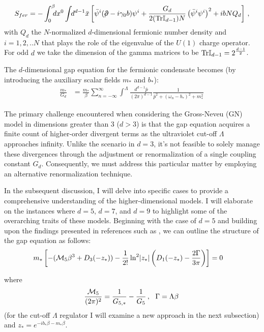 \documentclass[twoside]{article}
\begin{document}
\begin{align}
 S_{fer} = -\int_0^\beta \!\!\!dx^0\int \!\!d^{d-1}\bar{x} \left[\bar{\psi }^{i}(\slash\!\!\!\partial  -i\gamma_0 b)\psi ^{i}
+\frac{G_d}{2({\rm Tr}\mathbb I_{d-1})N}\left (\bar{\psi }^{i}\psi ^{i}\right )^{2} +ib NQ_d\right]\,,
\end{align}
with  $Q_d$ the $N$-normalized $d$-dimensional fermionic number density and $i=1,2,..N$ that plays the role of the eigenvalue of the $U(1)$ charge operator. For odd $d$ we take the dimension of the gamma matrices to be ${\rm Tr}{\mathbb I}_{d-1}=2^{\frac{d-1}{2}}$.


The $d$-dimensional  gap equation for the fermionic condensate becomes (by introducing the auxiliary scalar fields $m_*$ and $b_*$):
\begin{align}
\frac{m_*}{G_d}&=\frac{m_*}{\beta}\sum_{n=-\infty}^\infty\int^\Lambda\!\!\frac{d^{d-1} \bar{p}}{(2\pi)^{d-1}}\frac{1}{\bar{p}^2+(\omega_n-b_*)^2+m_*^2}\,
\end{align}


The primary challenge encountered when considering the Gross-Neveu (GN) model in dimensions greater than $3$ ($d>3$) is that the gap equation acquires a finite count of higher-order divergent terms as the ultraviolet cut-off $\Lambda$ approaches infinity. Unlike the scenario in $d=3$, it's not feasible to solely manage these divergences through the adjustment or renormalization of a single coupling constant $G_d$. Consequently, we must address this particular matter by employing an alternative renormalization technique.

In the subsequent discussion, I will delve into specific cases to provide a comprehensive understanding of the higher-dimensional models. I will elaborate on the instances where $d=5$, $d=7$, and $d=9$ to highlight some of the overarching traits of these models. Beginning with the case of $d=5$ and building upon the findings presented in references such as \cite{Filothodoros:2016txa, Filothodoros:2018}, we can outline the structure of the gap equation as follows:
\begin{align}
\label{ge5}
m_*\left[-({\cal M}_5\beta^3+D_3(-z_*))-
\frac{1}{2!}\ln^2\!|z_*|\left(D_1(-z_*)-\frac{2\Gamma}{3\pi}\right)\right]&=0\,
\end{align}

where 
\begin{equation}
\frac{{\cal M}_5}{(2\pi)^2}=\frac{1}{G_{5,*}}-\frac{1}{G_5}\,,\,\,\,\,\Gamma=\Lambda\beta\,
\end{equation}
(for the cut-off $\Lambda$ regulator I will examine a new approach in the next subsection) and $z_*=e^{-ib_*\beta-m_*\beta}$.
\end{document}
